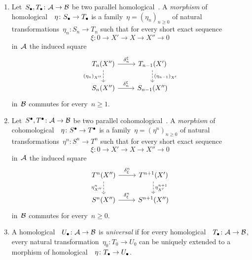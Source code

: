\begin{definition}
  \leavevmode
  \begin{enumerate}
    \item
      Let~$S_\bullet, T_\bullet \colon \mathcal{A} \to \mathcal{B}$ be two parallel homological~{\deltafuns}.
      A \emph{morphism} of homological~{\deltafun}~$\eta \colon S_\bullet \to T_\bullet$ is a family~$\eta = (\eta_n)_{n \geq 0}$ of natural transformations~$\eta_n \colon S_n \to T_n$ such that for every short exact sequence
      \[
        \xi
        \colon
        0
        \to
        X'
        \to
        X
        \to
        X''
        \to
        0
      \]
      in~$\mathcal{A}$ the induced square
      \[
        \begin{tikzcd}
            T_n(X'')
            \arrow{r}[above]{\delta^\xi_n}
            \arrow[dashed]{d}[left]{(\eta_n)_{X''}}
          & T_{n-1}(X')
            \arrow[dashed]{d}[right]{(\eta_{n-1})_{X'}}
          \\
            S_n(X'')
            \arrow{r}[above]{\delta^\xi_n}
          & S_{n-1}(X'')
        \end{tikzcd}
      \]
      in~$\mathcal{B}$ commutes for every~$n \geq 1$.
    \item
      Let~$S^\bullet, T^\bullet \colon \mathcal{A} \to \mathcal{B}$ be two parallel cohomological~{\deltafuns}.
      A \emph{morphism} of cohomological~{\deltafun}~$\eta \colon S^\bullet \to T^\bullet$ is a family~$\eta = (\eta^n)_{n \geq 0}$ of natural transformations~$\eta^n \colon S^n \to T^n$ such that for every short exact sequence
      \[
        \xi
        \colon
        0
        \to
        X'
        \to
        X
        \to
        X''
        \to
        0
      \]
      in~$\mathcal{A}$ the induced square
      \[
        \begin{tikzcd}
            T^n(X'')
            \arrow{r}[above]{\delta_\xi^n}
            \arrow[dashed]{d}[left]{\eta^n_{X''}}
          & T^{n+1}(X')
            \arrow[dashed]{d}[right]{\eta^{n+1}_{X'}}
          \\
            S^n(X'')
            \arrow{r}[above]{\delta_\xi^n}
          & S^{n+1}(X'')
        \end{tikzcd}
      \]
      in~$\mathcal{B}$ commutes for every~$n \geq 0$.
    \item
      A homological~{\deltafun}~$U_\bullet \colon \mathcal{A} \to \mathcal{B}$ is \emph{universal} if for every homological~{\deltafun}~$T_\bullet \colon \mathcal{A} \to \mathcal{B}$, every natural transformation~$\eta_0 \colon T_0 \to U_0$ can be uniquely extended to a morphism of homological~{\deltafuns}~$\eta \colon T_\bullet \to U_\bullet$.

\end{enumerate}
\end{definition}
